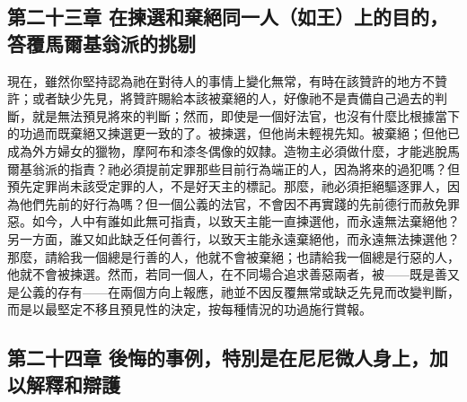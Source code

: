 
\subsection{第二十三章 在揀選和棄絕同一人（如王）上的目的，答覆馬爾基翁派的挑剔}

現在，雖然你堅持認為祂在對待人的事情上變化無常，有時在該贊許的地方不贊許；或者缺少先見，將贊許賜給本該被棄絕的人，好像祂不是責備自己過去的判斷，就是無法預見將來的判斷；然而，即使是一個好法官，也沒有什麼比根據當下的功過而既棄絕又揀選更一致的了。被揀選，但他尚未輕視先知。被棄絕；但他已成為外方婦女的獵物，摩阿布和漆冬偶像的奴隸。造物主必須做什麼，才能逃脫馬爾基翁派的指責？祂必須提前定罪那些目前行為端正的人，因為將來的過犯嗎？但預先定罪尚未該受定罪的人，不是好天主的標記。那麼，祂必須拒絕驅逐罪人，因為他們先前的好行為嗎？但一個公義的法官，不會因不再實踐的先前德行而赦免罪惡。如今，人中有誰如此無可指責，以致天主能一直揀選他，而永遠無法棄絕他？另一方面，誰又如此缺乏任何善行，以致天主能永遠棄絕他，而永遠無法揀選他？那麼，請給我一個總是行善的人，他就不會被棄絕；也請給我一個總是行惡的人，他就不會被揀選。然而，若同一個人，在不同場合追求善惡兩者，被——既是善又是公義的存有——在兩個方向上報應，祂並不因反覆無常或缺乏先見而改變判斷，而是以最堅定不移且預見性的決定，按每種情況的功過施行賞報。\par


\subsection{第二十四章 後悔的事例，特別是在尼尼微人身上，加以解釋和辯護}


